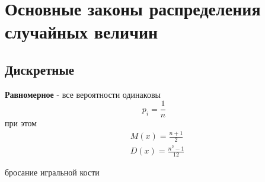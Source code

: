     \section{Основные законы распределения случайных величин}
    \subsection{Дискретные}
    \begin{opr}
        \textbf{Равномерное} - все вероятности одинаковы 
        \begin{equation}
            p_{i} = \frac{1}{n}
        \end{equation}
        при этом 
        \begin{equation}
            \begin{align*}
                &M(x) = \frac{n + 1}{2}\\
                &D(x) = \frac{n^{2}-1}{12}
            \end{align*}
        \end{equation}
        \begin{ex}
            бросание игральной кости
        \end{ex}
    \end{opr}
